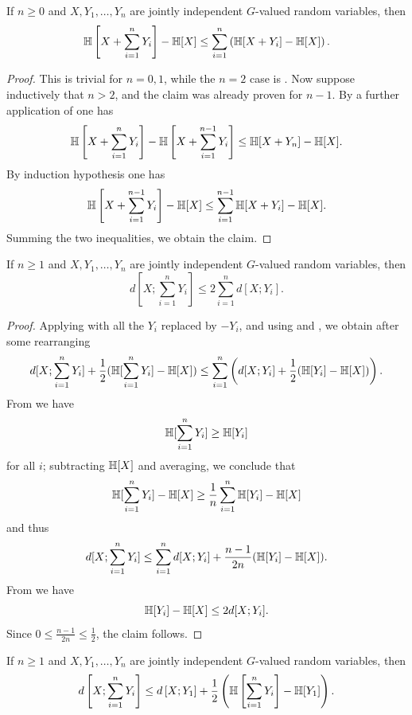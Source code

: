 \begin{lemma}\label{klm-1}\leanok  If $n \geq 0$ and $X, Y_1, \dots, Y_n$ are jointly independent $G$-valued random variables, then
  $$\mathbb{H}\left[X + \sum_{i=1}^n Y_i\right] - \mathbb{H}[X] \leq \sum_{i=1}^n \left(\mathbb{H}[X+Y_i] - \mathbb{H}[X]\right).$$
\end{lemma}

\begin{proof}\leanok  This is trivial for $n=0,1$, while the $n=2$ case is .  Now suppose inductively that $n > 2$, and the claim was already proven for $n-1$.  By a further application of  one has
$$  \mathbb{H}\left[X + \sum_{i=1}^n Y_i\right] -  \mathbb{H}\left[X + \sum_{i=1}^{n-1} Y_i\right] \leq \mathbb{H}[X+Y_n] - \mathbb{H}[X].$$
By induction hypothesis one has
$$ \mathbb{H}\left[X + \sum_{i=1}^{n-1} Y_i\right] - \mathbb{H}[X] \leq \sum_{i=1}^{n-1} \mathbb{H}[X+Y_i] - \mathbb{H}[X].$$
Summing the two inequalities, we obtain the claim.
\end{proof}

\begin{lemma}\label{klm-2}\leanok  If $n \geq 1$ and $X, Y_1, \dots, Y_n$ are jointly independent $G$-valued random variables, then
  $$ d[X; \sum_{i=1}^n Y_i] \leq 2 \sum_{i=1}^n d[X; Y_i].$$
\end{lemma}

\begin{proof}\leanok
  Applying  with all the $Y_i$ replaced by $-Y_i$, and using  and , we obtain after some rearranging
$$ d[X; \sum_{i=1}^n Y_i] + \frac{1}{2} (\mathbb{H}[\sum_{i=1}^n Y_i] - \mathbb{H}[X]) \leq \sum_{i=1}^n \left(d[X;Y_i] + \frac{1}{2} (\mathbb{H}[Y_i] - \mathbb{H}[X])\right).$$
From  we have
$$ \mathbb{H}[\sum_{i=1}^n Y_i] \geq \mathbb{H}[Y_i]$$
for all $i$; subtracting $\mathbb{H}[X]$ and averaging, we conclude that
$$ \mathbb{H}[\sum_{i=1}^n Y_i] - \mathbb{H}[X] \geq \frac{1}{n} \sum_{i=1}^n \mathbb{H}[Y_i] - \mathbb{H}[X]$$
and thus
$$ d[X; \sum_{i=1}^n Y_i] \leq \sum_{i=1}^n d[X;Y_i] + \frac{n-1}{2n} (\mathbb{H}[Y_i] - \mathbb{H}[X]).$$
From  we have
$$ \mathbb{H}[Y_i] - \mathbb{H}[X] \leq 2 d[X;Y_i].$$
Since $0 \leq \frac{n-1}{2n} \leq \frac{1}{2}$, the claim follows.
\end{proof}

\begin{lemma}\label{klm-3}\leanok  If $n \geq 1$ and $X, Y_1, \dots, Y_n$ are jointly independent $G$-valued random variables, then
  $$d\left[X; \sum_{i=1}^n Y_i\right] \leq d\left[X; Y_1\right] + \frac{1}{2}\left(\mathbb{H}\left[ \sum_{i=1}^n Y_i\right] - \mathbb{H}[Y_1]\right).$$
\end{lemma}


